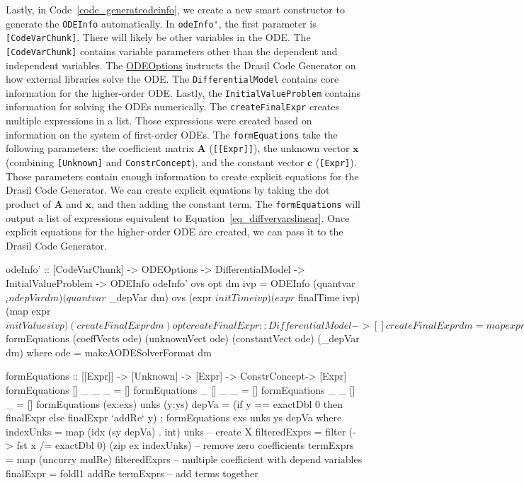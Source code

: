 Lastly, in Code~\ref{code_generateodeinfo}, we create a new smart constructor to generate the \verb|ODEInfo| automatically. In \verb|odeInfo'|, the first parameter is \verb|[CodeVarChunk]|. There will likely be other variables in the ODE. The \verb|[CodeVarChunk]| contains variable parameters other than the dependent and independent variables. The \href{https://jacquescarette.github.io/Drasil/docs/full/drasil-code-0.1.9.0/Language-Drasil-Data-ODEInfo.html#t:ODEOptions}{ODEOptions} instructs the Drasil Code Generator on how external libraries solve the ODE. The \verb|DifferentialModel| contains core information for the higher-order ODE. Lastly, the \verb|InitialValueProblem| contains information for solving the ODEs numerically. The \verb|createFinalExpr| creates multiple expressions in a list. Those expressions were created based on information on the system of first-order ODEs. The \verb|formEquations| take the following parameters: the coefficient matrix $\boldsymbol{A}$ (\verb|[[Expr]]|), the unknown vector $\boldsymbol{x}$ (combining \verb|[Unknown]| and \verb|ConstrConcept|), and the constant vector $\boldsymbol{c}$ (\verb|[Expr]|). Those parameters contain enough information to create explicit equations for the Drasil Code Generator. We can create explicit equations by taking the dot product of $\boldsymbol{A}$ and $\boldsymbol{x}$, and then adding the constant term. The \verb|formEquations| will output a list of expressions equivalent to Equation~\ref{eq_diffvervarslinear}. Once explicit equations for the higher-order ODE are created, we can pass it to the Drasil Code Generator.

\begin{listing}[ht]
\begin{haskell1}
odeInfo' :: [CodeVarChunk] -> ODEOptions -> DifferentialModel -> InitialValueProblem -> ODEInfo
odeInfo' ovs opt dm ivp = ODEInfo 
  (quantvar $ _indepVar dm) 
  (quantvar $ _depVar dm) 
  ovs 
  (expr $ initTime ivp)
  (expr $ finalTime ivp)
  (map expr $ initValues ivp)
  (createFinalExpr dm)
  opt

createFinalExpr :: DifferentialModel -> []
createFinalExpr dm = map expr $ formEquations (coeffVects ode) (unknownVect ode) (constantVect ode) (_depVar dm)
  where ode = makeAODESolverFormat dm

formEquations :: [[Expr]] -> [Unknown] -> [Expr] -> ConstrConcept-> [Expr]
formEquations [] _ _ _ = []
formEquations _ [] _ _ = []
formEquations _ _ [] _ = []
formEquations (ex:exs) unks (y:ys) depVa =
  (if y == exactDbl 0 then finalExpr else finalExpr `addRe` y) : formEquations exs unks ys depVa
  where indexUnks = map (idx (sy depVa) . int) unks -- create X
        filteredExprs = filter (\x -> fst x /= exactDbl 0) (zip ex indexUnks) -- remove zero coefficients
        termExprs = map (uncurry mulRe) filteredExprs -- multiple coefficient with depend variables
        finalExpr = foldl1 addRe termExprs -- add terms together
\end{haskell1}
\label{code_generateodeinfo}
\end{listing}
